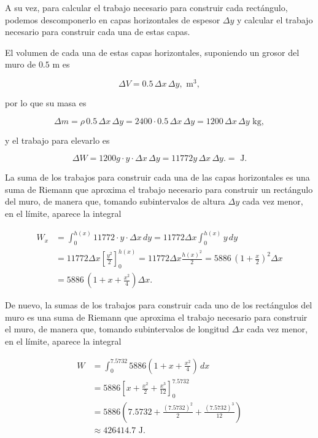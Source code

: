\documentclass[
  spanish,
  a4paper,
]{scrreport}
\theoremstyle{definition}
\theoremstyle{remark}
\begin{document}
\begin{tcolorbox}
\begin{enumerate}
  A su vez, para calcular el trabajo necesario para construir cada
  rectángulo, podemos descomponerlo en capas horizontales de espesor
  \(\Delta y\) y calcular el trabajo necesario para construir cada una
  de estas capas.

  El volumen de cada una de estas capas horizontales, suponiendo un
  grosor del muro de \(0.5\) m es

  \[
  \Delta V =0.5\, \Delta x \, \Delta y, \text{ m}^3,
  \]

  por lo que su masa es

  \[
  \Delta m = \rho\, 0.5\, \Delta x\, \Delta y
  = 2400 \cdot 0.5\, \Delta x\, \Delta y
  = 1200\, \Delta x\, \Delta y \text{ kg},
  \]

  y el trabajo para elevarlo es

  \[
  \Delta W = 1200 g\cdot y \cdot \Delta x\, \Delta y
  = 11772 y\, \Delta x\, \Delta y. 
  = \text{ J}.
  \]

  La suma de los trabajos para construir cada una de las capas
  horizontales es una suma de Riemann que aproxima el trabajo necesario
  para construir un rectángulo del muro, de manera que, tomando
  subintervalos de altura \(\Delta y\) cada vez menor, en el límite,
  aparece la integral

  \begin{align*}
  W_x 
  &= \int_0^{h(x)} 11772\cdot y\cdot \Delta x\, dy 
  = 11772 \Delta x \int_0^{h(x)} y\, dy \\
  &= 11772 \Delta x \left[\frac{y^2}{2}\right]_0^{h(x)}
  = 11772 \Delta x \frac{h(x)^2}{2} 
  = 5886\, (1+\frac{x}{2})^2 \Delta x \\ 
  &= 5886\, \left(1 + x + \frac{x^2}{4}\right) \Delta x.
  \end{align*}

  De nuevo, la sumas de los trabajos para construir cada uno de los
  rectángulos del muro es una suma de Riemann que aproxima el trabajo
  necesario para construir el muro, de manera que, tomando subintervalos
  de longitud \(\Delta x\) cada vez menor, en el límite, aparece la
  integral

  \begin{align*}
  W 
  &= \int_0^{7.5732} 5886 \left(1 + x + \frac{x^2}{4}\right)\, dx \\
  &= 5886 \left[x + \frac{x^2}{2} + \frac{x^3}{12}\right]_0^{7.5732} \\
  &= 5886 \left(7.5732 + \frac{(7.5732)^2}{2} + \frac{(7.5732)^3}{12}\right) \\
  &\approx 426414.7 \mbox{ J}.
  \end{align*}
\end{enumerate}

\end{tcolorbox}
\end{document}
